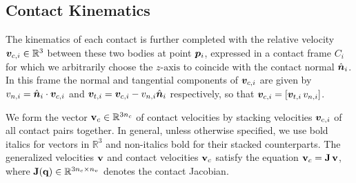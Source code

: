 
\subsection{Contact Kinematics}
\label{sec:contact_modeling}

 The
kinematics of each contact is further completed with the relative velocity
${\bm{v}}_{c,i}\in\mathbb{R}^3$ between these two bodies at point ${\bm{p}}_i$,
expressed in a contact frame $C_i$ for which we arbitrarily choose the
$z\text{-axis}$ to coincide with the contact normal $\hat{{\bm{n}}}_i$. In this
frame the normal and tangential components of ${\bm{v}}_{c,i}$ are given by
$v_{n,i} = \hat{{\bm{n}}}_i\cdot{\bm{v}}_{c,i}$ and ${\bm{v}}_{t,i} =
{\bm{v}}_{c,i}-v_{n,i}\hat{{\bm{n}}}_i$ respectively, so that
${\bm{v}}_{c,i}=[{\bm{v}}_{t,i}\,v_{n,i}]$.

We form the vector ${\mathbf{v}}_{c}\in\mathbb{R}^{3n_c}$ of contact velocities by
stacking velocities ${\bm{v}}_{c,i}$ of all contact pairs together. In general,
unless otherwise specified, we use bold italics for vectors in $\mathbb{R}^3$
and non-italics bold for their stacked counterparts. The generalized velocities
${\mathbf{v}}$ and contact velocities ${\mathbf{v}}_c$ satisfy the equation
${\mathbf{v}}_c={\mathbf{J}}\,{\mathbf{v}}$, where ${\mathbf{J}}({\mathbf{q}})\in\mathbb{R}^{3n_c\times n_v}$
denotes the contact Jacobian.
